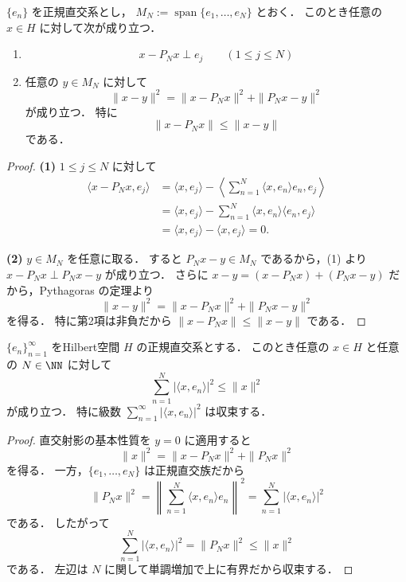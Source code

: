 \begin{theorem}[直交射影の基本性質]
$\{e_n\}$ を正規直交系とし，
$M_N:=\operatorname{span}\{e_1,\dots,e_N\}$ とおく．
このとき任意の $x\in H$ に対して次が成り立つ．
\begin{enumerate}
    \item
    \[
    x-P_Nx \perp e_j
    \qquad (1\le j\le N)
    \]
    \item 任意の $y\in M_N$ に対して
    \[
    \|x-y\|^2
    =
    \|x-P_Nx\|^2
    +
    \|P_Nx-y\|^2
    \]
    が成り立つ．
    特に
    \[
    \|x-P_Nx\|\le \|x-y\|
    \]
    である．
\end{enumerate}
\end{theorem}
\begin{proof}
\textbf{(1)}\quad
$1\le j\le N$ に対して
\begin{align*}
\langle x-P_Nx,e_j\rangle
&=
\langle x,e_j\rangle
-
\left\langle \sum_{n=1}^N \langle x,e_n\rangle e_n,e_j\right\rangle \\
&=
\langle x,e_j\rangle
-
\sum_{n=1}^N \langle x,e_n\rangle \langle e_n,e_j\rangle \\
&=
\langle x,e_j\rangle-\langle x,e_j\rangle
=0.
\end{align*}

\textbf{(2)}\quad
$y\in M_N$ を任意に取る．
すると
$P_Nx-y\in M_N$ であるから，(1) より $x-P_Nx \perp P_Nx-y$ が成り立つ．
さらに
$x-y=(x-P_Nx)+(P_Nx-y)$ だから，Pythagoras の定理より
\[
\|x-y\|^2
=
\|x-P_Nx\|^2+\|P_Nx-y\|^2
\]
を得る．
特に第2項は非負だから
$\|x-P_Nx\|\le \|x-y\|$ である．
\end{proof}

\begin{corollary}[Besselの不等式]
$\{e_n\}_{n=1}^{\infty}$ をHilbert空間 $H$ の正規直交系とする．
このとき任意の $x\in H$ と任意の $N\in\NN$ に対して
\[
\sum_{n=1}^N |\langle x,e_n\rangle|^2\le \|x\|^2
\]
が成り立つ．
特に級数
$\sum_{n=1}^{\infty} |\langle x,e_n\rangle|^2$ は収束する．
\end{corollary}
\begin{proof}
直交射影の基本性質を $y=0$ に適用すると
\[
\|x\|^2=\|x-P_Nx\|^2+\|P_Nx\|^2
\]
を得る．
一方，$\{e_1,\dots,e_N\}$ は正規直交族だから
\[
\|P_Nx\|^2
=
\left\|
\sum_{n=1}^N \langle x,e_n\rangle e_n
\right\|^2
=
\sum_{n=1}^N |\langle x,e_n\rangle|^2
\]
である．
したがって
\[
\sum_{n=1}^N |\langle x,e_n\rangle|^2
=
\|P_Nx\|^2
\le
\|x\|^2
\]
である．
左辺は $N$ に関して単調増加で上に有界だから収束する．
\end{proof}

